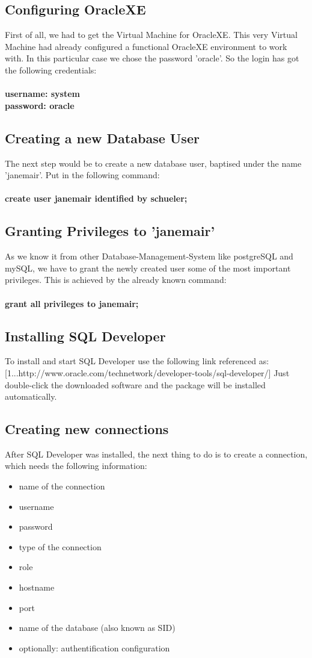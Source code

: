\documentclass[11pt,a4paper]{article}
\begin{document}
\subsection{Configuring OracleXE}
First of all, we had to get the Virtual Machine for OracleXE. This very Virtual Machine had already configured a functional OracleXE environment to work with. In this particular case we chose the password 'oracle'. So the login has got the following credentials: \\ \\ \textbf{username: system} \\ \textbf{password: oracle}
\subsection{Creating a new Database User}
The next step would be to create a new database user, baptised under the name 'janemair'. Put in the following command: \\ \\ \textbf{create user janemair identified by schueler;}
\subsection{Granting Privileges to 'janemair'}
As we know it from other Database-Management-System like postgreSQL and mySQL, we have to grant the newly created user some of the most important privileges. This is achieved by the already known command: \\ \\ \textbf{grant all privileges to janemair;}
\subsection{Installing SQL Developer}
To install and start SQL Developer use the following link referenced as: [1...http://www.oracle.com/technetwork/developer-tools/sql-developer/]
Just double-click the downloaded software and the package will be installed automatically.
\subsection{Creating new connections}
After SQL Developer was installed, the next thing to do is to create a connection, which needs the following information:
\begin{itemize}
	\item name of the connection
	\item username
	\item password
	\item type of the connection
	\item role
	\item hostname
	\item port
	\item name of the database (also known as SID)
	\item optionally: authentification configuration 
\end{itemize}
\end{document}
